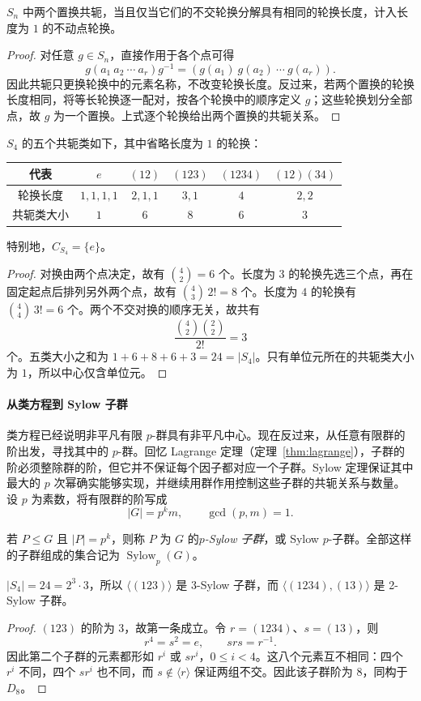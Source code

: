 \documentclass[lang=cn,a4paper,fontset=none,zihao=false,10pt,openany,twoside]{beautybook}
\numberwithin{algorithm}{chapter}
\begin{document}
\begin{proposition}[对称群的共轭类]
$S_n$ 中两个置换共轭，当且仅当它们的不交轮换分解具有相同的轮换长度，计入长度为 $1$ 的不动点轮换。
\end{proposition}
\begin{proof}
对任意 $g\in S_n$，直接作用于各个点可得
\[
 g(a_1\ a_2\ \cdots\ a_r)g^{-1}
   =(g(a_1)\ g(a_2)\ \cdots\ g(a_r)).
\]
因此共轭只更换轮换中的元素名称，不改变轮换长度。反过来，若两个置换的轮换长度相同，将等长轮换逐一配对，按各个轮换中的顺序定义 $g$；这些轮换划分全部点，故 $g$ 为一个置换。上式逐个轮换给出两个置换的共轭关系。
\end{proof}
\begin{example}[$S_4$ 的共轭类]
$S_4$ 的五个共轭类如下，其中省略长度为 $1$ 的轮换：
\begin{center}
\begin{tabular}{c|ccccc}
代表 & $e$ & $(12)$ & $(123)$ & $(1234)$ & $(12)(34)$ \\
\hline
轮换长度 & $1,1,1,1$ & $2,1,1$ & $3,1$ & $4$ & $2,2$ \\
共轭类大小 & $1$ & $6$ & $8$ & $6$ & $3$
\end{tabular}
\end{center}
特别地，$C_{S_4}=\{e\}$。
\end{example}
\begin{proof}
对换由两个点决定，故有 $\binom42=6$ 个。长度为 $3$ 的轮换先选三个点，再在固定起点后排列另外两个点，故有 $\binom43\,2!=8$ 个。长度为 $4$ 的轮换有 $\binom44\,3!=6$ 个。两个不交对换的顺序无关，故共有
\[
 \frac{\binom42\binom22}{2!}=3
\]
个。五类大小之和为 $1+6+8+6+3=24=|S_4|$。只有单位元所在的共轭类大小为 $1$，所以中心仅含单位元。
\end{proof}

\paragraph{从类方程到 Sylow 子群}
类方程已经说明非平凡有限 $p$-群具有非平凡中心。现在反过来，从任意有限群的阶出发，寻找其中的 $p$-群。回忆 Lagrange 定理（定理~\ref{thm:lagrange}），子群的阶必须整除群的阶，但它并不保证每个因子都对应一个子群。Sylow 定理保证其中最大的 $p$ 次幂确实能够实现，并继续用群作用控制这些子群的共轭关系与数量。设 $p$ 为素数，将有限群的阶写成
\[
 |G|=p^k m,\qquad \gcd(p,m)=1.
\]
\begin{definition}[Sylow 子群]
若 $P\le G$ 且 $|P|=p^k$，则称 $P$ 为 $G$ 的\emph{$p$-Sylow 子群}，或 Sylow $p$-子群。全部这样的子群组成的集合记为 $\operatorname{Sylow}_p(G)$。
\end{definition}
\begin{example}[$S_4$ 中的 Sylow 子群]
$|S_4|=24=2^3\cdot3$，所以 $\langle(123)\rangle$ 是 3-Sylow 子群，而 $\langle(1234),(13)\rangle$ 是 2-Sylow 子群。
\end{example}
\begin{proof}
$(123)$ 的阶为 $3$，故第一条成立。令 $r=(1234)$、$s=(13)$，则
\[
 r^4=s^2=e,\qquad srs=r^{-1}.
\]
因此第二个子群的元素都形如 $r^i$ 或 $sr^i$，$0\le i<4$。这八个元素互不相同：四个 $r^i$ 不同，四个 $sr^i$ 也不同，而 $s\notin\langle r\rangle$ 保证两组不交。因此该子群阶为 $8$，同构于 $D_8$。
\end{proof}
\end{document}
